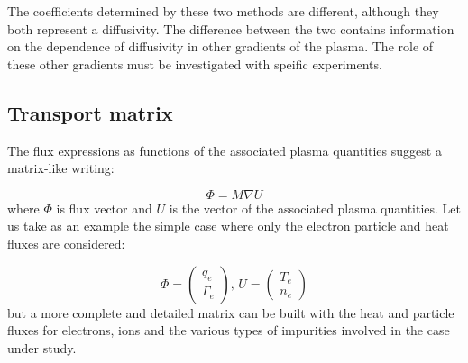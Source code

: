 The coefficients determined by these two methods are different, although they both represent a diffusivity. The difference between the two contains information on the dependence of diffusivity in other gradients of the plasma. The role of these other gradients must be investigated with speific experiments.
				
				
				\subsection{Transport matrix}
				\label{sub:MatriceDeTransport}

The flux expressions as functions of the associated plasma quantities suggest a matrix-like writing:
				
\[
	\Phi = M \nabla U
\]
where $\Phi$ is flux vector and $U$ is the vector of the associated plasma quantities. Let us take as an example the simple case where only the electron particle and heat fluxes are considered: 

	\[
	\Phi = \left(
								\begin{array}{c}
									q_e				\\
									\Gamma_e
								\end{array}
				 \right)
	\mbox{, }
	U =		\left(
								\begin{array}{c}
									T_e				\\
									n_e
								\end{array}
				 \right)
\]
but a more complete and detailed matrix can be built with the heat and particle fluxes for electrons, ions and the various types of impurities involved in the case under study.

